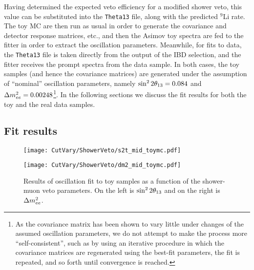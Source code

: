\documentclass[../thesis.tex]{subfiles}
\begin{document}
Having determined the expected veto efficiency for a modified shower veto, this value can be substituted into the \texttt{Theta13} file, along with the predicted $^9$Li rate. The toy MC are then run as usual in order to generate the covariance and detector response matrices, etc., and then the Asimov toy spectra are fed to the fitter in order to extract the oscillation parameters. Meanwhile, for fits to data, the \texttt{Theta13} file is taken directly from the output of the IBD selection, and the fitter receives the prompt spectra from the data sample. In both cases, the toy samples (and hence the covariance matrices) are generated under the assumption of ``nominal'' oscillation parameters, namely $\sin^2 2\theta_{13} = 0.084$ and $\Delta m^2_{ee} = 0.00248$\footnote{As the covariance matrix has been shown to vary little under changes of the assumed oscillation parameters, we do not attempt to make the process more ``self-consistent'', such as by using an iterative procedure in which the covariance matrices are regenerated using the best-fit parameters, the fit is repeated, and so forth until convergence is reached.}. In the following sections we discuss the fit results for both the toy and the real data samples.

\begin{comment}
Regarding results: Don't comment on ``structure'' until we've regenerated the 2D plots using the fix to SinglesCalc::calcSinglesHz. (Accidentals rate might have been biased, throwing off the fit.)
\end{comment}

\subsection{Fit results}%
\label{sec:cutVaryMuVetoDataResults}

\begin{figure}[ht]
  \begin{minipage}{0.5\linewidth}%
    \texttt{[image: CutVary/ShowerVeto/s2t\_mid\_toymc.pdf]}%
  \end{minipage}%
  \begin{minipage}{0.5\linewidth}%
    \texttt{[image: CutVary/ShowerVeto/dm2\_mid\_toymc.pdf]}%
  \end{minipage}%
  \caption{Results of oscillation fit to toy samples as a function of the shower-muon veto parameters. On the left is $\sin^2 2\theta_{13}$ and on the right is $\Delta m^2_{ee}$.}
  \label{fig:cutVaryVetoEffToyResults}
\end{figure}
\end{document}
